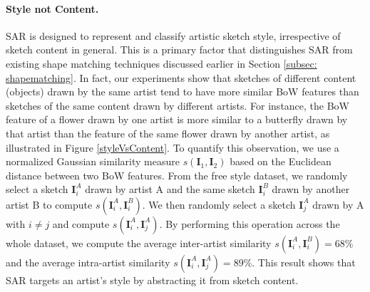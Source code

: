 \vspace{-3mm}
\paragraph{Style not Content.} SAR is designed to represent and classify artistic sketch style, irrespective of sketch content in general. This is a primary factor that distinguishes SAR from existing shape matching techniques discussed earlier in Section \ref{subsec: shapematching}. In fact, our experiments show that sketches of different content (objects) drawn by the same artist tend to have more similar BoW features than sketches of the same content drawn by different artists. For instance, the BoW feature of a flower drawn by one artist is more similar to a butterfly drawn by that artist than the feature of the same flower drawn by another artist, as illustrated in Figure \ref{styleVsContent}. To quantify this observation, we use a normalized Gaussian similarity measure $s(\mathbf{I}_1,\mathbf{I}_2)$ based on the Euclidean distance between two BoW features. From the free style dataset, we randomly select a sketch $\mathbf{I}_i^A$ drawn by artist A and the same sketch $\mathbf{I}_i^B$  drawn by another artist B to compute $s(\mathbf{I}_i^A,\mathbf{I}_i^B)$. We then randomly select a sketch $\mathbf{I}_j^A$ drawn by A with $i\neq j$ and compute $s(\mathbf{I}_i^A,\mathbf{I}_j^A)$. By performing this operation across the whole dataset, we compute the average inter-artist similarity $s(\mathbf{I}_i^A,\mathbf{I}_i^B)=68\%$ and the average intra-artist similarity $s(\mathbf{I}_i^A,\mathbf{I}_j^A)=89\%$.  This result shows that SAR targets an artist's style by abstracting it from sketch content.





